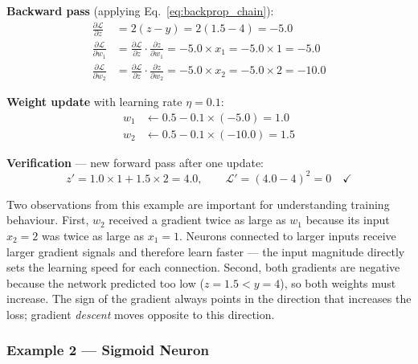 \documentclass[12pt, a4paper]{article}
\begin{document}
\textbf{Backward pass} (applying Eq.~\ref{eq:backprop_chain}):
\begin{align}
    \frac{\partial \mathcal{L}}{\partial z}
    &= 2(z - y) = 2(1.5 - 4) = -5.0
    \label{eq:bwd_dLdz}\\[4pt]
    \frac{\partial \mathcal{L}}{\partial w_1}
    &= \frac{\partial \mathcal{L}}{\partial z}
       \cdot \frac{\partial z}{\partial w_1}
     = -5.0 \times x_1 = -5.0 \times 1 = -5.0
    \label{eq:bwd_w1}\\[4pt]
    \frac{\partial \mathcal{L}}{\partial w_2}
    &= \frac{\partial \mathcal{L}}{\partial z}
       \cdot \frac{\partial z}{\partial w_2}
     = -5.0 \times x_2 = -5.0 \times 2 = -10.0
    \label{eq:bwd_w2}
\end{align}

\textbf{Weight update} with learning rate $\eta = 0.1$:
\begin{align}
    w_1 &\leftarrow 0.5 - 0.1 \times (-5.0) = 1.0
    \label{eq:update_w1}\\
    w_2 &\leftarrow 0.5 - 0.1 \times (-10.0) = 1.5
    \label{eq:update_w2}
\end{align}

\textbf{Verification} --- new forward pass after one update:
\begin{equation}
    z' = 1.0 \times 1 + 1.5 \times 2 = 4.0,
    \qquad
    \mathcal{L}' = (4.0 - 4)^2 = 0 \quad \checkmark
    \label{eq:verify}
\end{equation}

Two observations from this example are important for understanding training
behaviour. First, $w_2$ received a gradient twice as large as $w_1$ because its
input $x_2 = 2$ was twice as large as $x_1 = 1$. Neurons connected to larger
inputs receive larger gradient signals and therefore learn faster --- the input
magnitude directly sets the learning speed for each connection. Second, both
gradients are negative because the network predicted too low ($z = 1.5 < y = 4$),
so both weights must increase. The sign of the gradient always points in the
direction that increases the loss; gradient \emph{descent} moves opposite to
this direction.


\subsubsection{Example 2 — Sigmoid Neuron}
\label{ex:cs231n_sigmoid}
\end{document}
